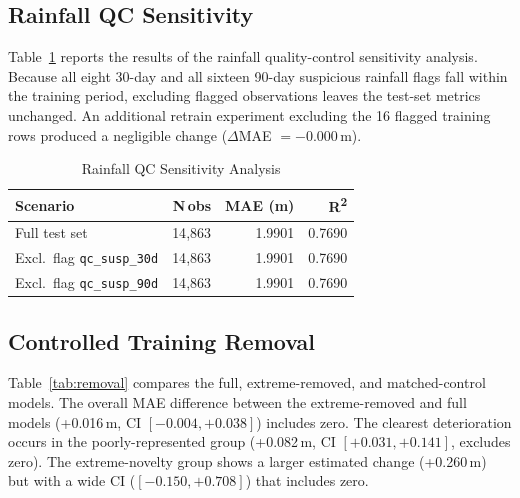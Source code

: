 \documentclass[conference]{IEEEtran}
\begin{document}
\subsection{Rainfall QC Sensitivity}

Table~\ref{tab:qc_sensitivity} reports the results of the rainfall
quality-control sensitivity analysis.
Because all eight 30-day and all sixteen 90-day suspicious rainfall flags
fall within the training period, excluding flagged observations leaves the
test-set metrics unchanged.
An additional retrain experiment excluding the 16 flagged training rows
produced a negligible change ($\Delta$MAE $= -0.000$\,m).

\begin{table}[htbp]
\centering
\caption{Rainfall QC Sensitivity Analysis}
\label{tab:qc_sensitivity}
\begin{tabular}{@{}lrrr@{}}
\toprule
\textbf{Scenario} & \textbf{N\,obs} & \textbf{MAE (m)} & \textbf{R\textsuperscript{2}} \\
\midrule
Full test set                       & 14{,}863 & 1.9901 & 0.7690 \\
Excl.\ flag \texttt{qc\_susp\_30d}  & 14{,}863 & 1.9901 & 0.7690 \\
Excl.\ flag \texttt{qc\_susp\_90d}  & 14{,}863 & 1.9901 & 0.7690 \\
\bottomrule
\end{tabular}
\end{table}

\subsection{Controlled Training Removal}

Table~\ref{tab:removal} compares the full, extreme-removed, and
matched-control models.
The overall MAE difference between the extreme-removed and full models
(+0.016\,m, CI $[-0.004, +0.038]$) includes zero.
The clearest deterioration occurs in the poorly-represented group
(+0.082\,m, CI $[+0.031, +0.141]$, excludes zero).
The extreme-novelty group shows a larger estimated change (+0.260\,m) but
with a wide CI ($[-0.150, +0.708]$) that includes zero.
\end{document}

